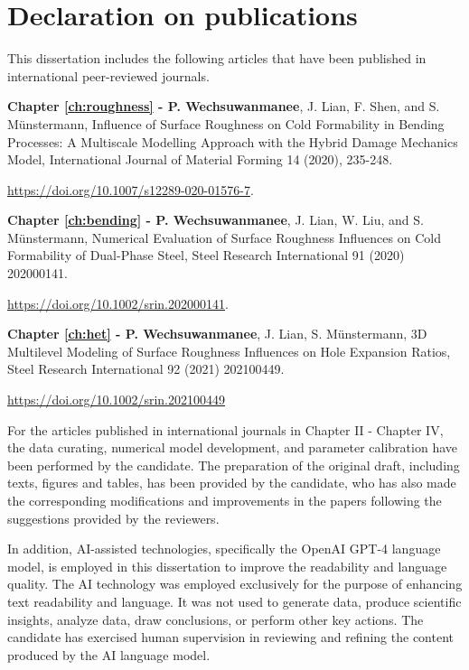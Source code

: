 \chapter*{Declaration on publications}

This dissertation includes the following articles that have been published in international peer-reviewed journals.

\vspace{20pt}

\textbf{Chapter \ref{ch:roughness} - P. Wechsuwanmanee}, J. Lian, F. Shen, and S. Münstermann, Influence of Surface Roughness on Cold Formability in Bending Processes: A Multiscale Modelling Approach with the Hybrid Damage Mechanics Model, International Journal of Material Forming 14 (2020), 235-248.

\vspace{5pt}

\noindent \url{https://doi.org/10.1007/s12289-020-01576-7}.

\vspace{20pt}

\textbf{Chapter \ref{ch:bending} - P. Wechsuwanmanee}, J. Lian, W. Liu, and S. Münstermann, Numerical Evaluation of Surface Roughness Influences on Cold Formability of Dual-Phase Steel, Steel Research International 91 (2020) 202000141.

\vspace{5pt}

\noindent \url{https://doi.org/10.1002/srin.202000141}.

\vspace{20pt}

\textbf{Chapter \ref{ch:het} - P. Wechsuwanmanee}, J. Lian, S. Münstermann, 3D Multilevel Modeling of Surface Roughness Influences on Hole Expansion Ratios, Steel Research International 92 (2021) 202100449.

\vspace{5pt}

\noindent \url{https://doi.org/10.1002/srin.202100449}

\vspace{20pt}

For the articles published in international journals in Chapter II - Chapter IV, the data curating, numerical model development, and parameter calibration have been performed by the candidate. The preparation of the original draft, including texts, figures and tables, has been provided by the candidate, who has also made the corresponding modifications and improvements in the papers following the suggestions provided by the reviewers.

In addition, AI-assisted technologies, specifically the OpenAI GPT-4 language model, is employed in this dissertation to improve the readability and language quality. The AI technology was employed exclusively for the purpose of enhancing text readability and language. It was not used to generate data, produce scientific insights, analyze data, draw conclusions, or perform other key actions. The candidate has exercised human supervision in reviewing and refining the content produced by the AI language model.